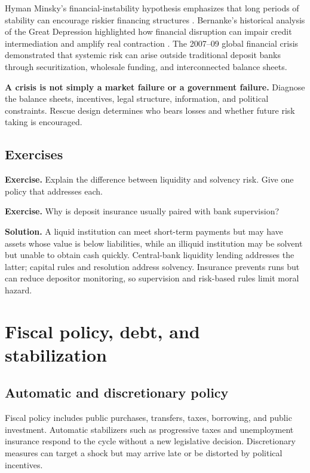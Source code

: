 \documentclass[11pt,oneside,openany]{book}
\newcommand{\exercise}[1]{\textbf{Exercise.} #1}
\newcommand{\solution}[1]{\textbf{Solution.} #1}
\begin{document}
Hyman Minsky's financial-instability hypothesis emphasizes that long periods of stability can encourage riskier financing structures \cite{minsky1986}. Bernanke's historical analysis of the Great Depression highlighted how financial disruption can impair credit intermediation and amplify real contraction \cite{bernanke1983}. The 2007--09 global financial crisis demonstrated that systemic risk can arise outside traditional deposit banks through securitization, wholesale funding, and interconnected balance sheets.

\begin{warningbox}
\textbf{A crisis is not simply a market failure or a government failure.} Diagnose the balance sheets, incentives, legal structure, information, and political constraints. Rescue design determines who bears losses and whether future risk taking is encouraged.
\end{warningbox}

\section{Exercises}

\exercise{Explain the difference between liquidity and solvency risk. Give one policy that addresses each.}

\exercise{Why is deposit insurance usually paired with bank supervision?}

\solution{A liquid institution can meet short-term payments but may have assets whose value is below liabilities, while an illiquid institution may be solvent but unable to obtain cash quickly. Central-bank liquidity lending addresses the latter; capital rules and resolution address solvency. Insurance prevents runs but can reduce depositor monitoring, so supervision and risk-based rules limit moral hazard.}

\chapter{Fiscal policy, debt, and stabilization}
\label{ch:fiscal}

\section{Automatic and discretionary policy}

Fiscal policy includes public purchases, transfers, taxes, borrowing, and public investment. Automatic stabilizers such as progressive taxes and unemployment insurance respond to the cycle without a new legislative decision. Discretionary measures can target a shock but may arrive late or be distorted by political incentives.
\end{document}
